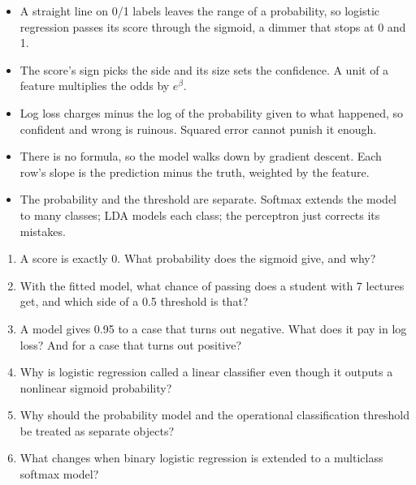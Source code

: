 \begin{chapterrecap}
\begin{itemize}
  \item A straight line on 0/1 labels leaves the range of a probability, so logistic regression passes its score through the sigmoid, a dimmer that stops at 0 and 1.
  \item The score's sign picks the side and its size sets the confidence. A unit of a feature multiplies the odds by $e^{\beta}$.
  \item Log loss charges minus the log of the probability given to what happened, so confident and wrong is ruinous. Squared error cannot punish it enough.
  \item There is no formula, so the model walks down by gradient descent. Each row's slope is the prediction minus the truth, weighted by the feature.
  \item The probability and the threshold are separate. Softmax extends the model to many classes; LDA models each class; the perceptron just corrects its mistakes.
\end{itemize}
\end{chapterrecap}

\begin{quickcheck}
\begin{enumerate}
  \item A score is exactly 0. What probability does the sigmoid give, and why?
  \item With the fitted model, what chance of passing does a student with 7 lectures get, and which side of a 0.5 threshold is that?
  \item A model gives 0.95 to a case that turns out negative. What does it pay in log loss? And for a case that turns out positive?
  \item Why is logistic regression called a linear classifier even though it outputs a nonlinear sigmoid probability?
  \item Why should the probability model and the operational classification threshold be treated as separate objects?
  \item What changes when binary logistic regression is extended to a multiclass softmax model?
\end{enumerate}
\end{quickcheck}
